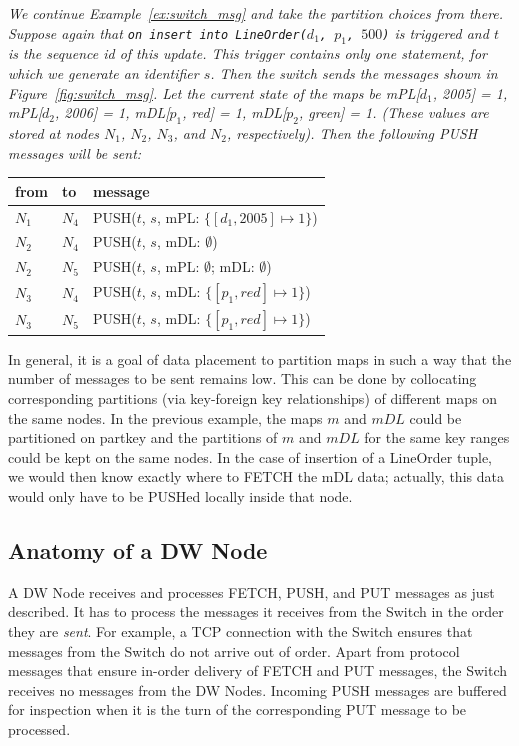 \begin{example}\em
\label{ex:switch_msg2}
We continue Example~\ref{ex:switch_msg} and take the partition choices
from there.
Suppose again that
{\tt on insert into LineOrder($d_1$, $p_1$, $500$)} is triggered and $t$ is
the sequence id of this update.
This trigger contains only one statement,
for which we generate an identifier $s$.
Then the switch sends the messages shown in Figure~\ref{fig:switch_msg}.
%
Let the current state of the maps be
mPL[$d_1$, 2005] = 1, mPL[$d_2$, 2006] = 1, mDL[$p_1$, red] = 1,
mDL[$p_2$, green] = 1. (These values are stored at nodes
$N_1$, $N_2$, $N_3$, and $N_2$, respectively).
Then the following PUSH messages will be sent:
\begin{center}
\begin{tabular}{ll|l}
from & to & message \\
\hline
$N_1$ & $N_4$ & PUSH($t$, $s$, mPL: $\{ [d_1, 2005] \mapsto 1 \}$) \\
$N_2$ & $N_4$ & PUSH($t$, $s$, mDL: $\emptyset$) \\
$N_2$ & $N_5$ & PUSH($t$, $s$, mPL: $\emptyset$; mDL: $\emptyset$) \\
$N_3$ & $N_4$ & PUSH($t$, $s$, mDL: $\{ [p_1, red] \mapsto 1 \}$) \\
$N_3$ & $N_5$ & PUSH($t$, $s$, mDL: $\{ [p_1, red] \mapsto 1 \}$) \\
\end{tabular}
\end{center}
\end{example}


In general, it is a goal of data placement
to partition maps in such a way that the number of
messages to be sent remains low. This can be done by collocating
corresponding partitions (via key-foreign key relationships)
of different maps on the same nodes.
In the previous example, the maps $m$ and $mDL$
could be partitioned on partkey and the partitions of $m$ and $mDL$ for the
same key ranges could be kept on the same nodes.
In the case of insertion of a LineOrder tuple, we would then know exactly
where to FETCH the mDL data; actually, this data would only have to be
PUSHed locally inside that node.


\subsection{Anatomy of a DW Node}


A DW Node receives and processes FETCH, PUSH, and PUT messages
as just described.
It has to process the messages it receives from the Switch 
in the order they are {\em sent}\/. For example, a
TCP connection with the Switch ensures that messages from the 
Switch do not arrive out of order. Apart from protocol messages
that ensure in-order delivery of FETCH and PUT messages, the Switch receives no
messages from the DW Nodes.
Incoming PUSH messages are buffered for inspection when it is the turn of
the corresponding PUT message to be processed.

